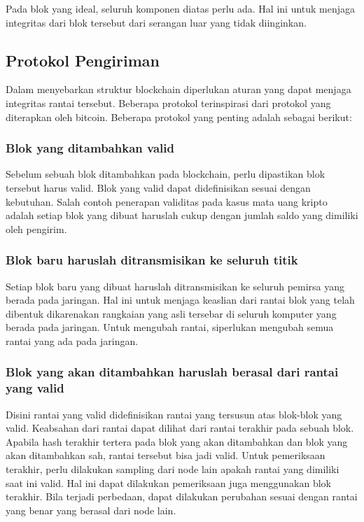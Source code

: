 \documentclass[10pt,conference]{IEEEtran}
\theoremstyle{definition}
\begin{document}
    
Pada blok yang ideal, seluruh komponen diatas perlu ada. Hal ini untuk menjaga integritas dari blok tersebut dari serangan luar yang tidak diinginkan.

\subsection{Protokol Pengiriman}
Dalam menyebarkan struktur blockchain diperlukan aturan yang dapat menjaga integritas rantai tersebut. Beberapa protokol terinspirasi dari protokol yang diterapkan oleh bitcoin. Beberapa protokol yang penting adalah sebagai berikut:

\subsubsection{Blok yang ditambahkan valid}
Sebelum sebuah blok ditambahkan pada blockchain, perlu dipastikan blok tersebut harus valid. Blok yang valid dapat didefinisikan sesuai dengan kebutuhan. Salah contoh penerapan validitas pada kasus mata uang kripto adalah setiap blok yang dibuat haruslah cukup dengan jumlah saldo yang dimiliki oleh pengirim.

\subsubsection{Blok baru haruslah ditransmisikan ke seluruh titik}
Setiap blok baru yang dibuat haruslah ditransmisikan ke seluruh pemirsa yang berada pada jaringan. Hal ini untuk menjaga keaslian dari rantai blok yang telah dibentuk dikarenakan rangkaian yang asli tersebar di seluruh komputer  yang berada pada jaringan. Untuk mengubah rantai, siperlukan mengubah semua rantai yang ada pada jaringan.

\subsubsection{Blok yang akan ditambahkan haruslah berasal dari rantai yang valid}
Disini rantai yang valid didefinisikan rantai yang tersusun atas blok-blok yang valid. Keabsahan dari rantai dapat dilihat dari rantai terakhir pada sebuah blok. Apabila hash terakhir tertera pada blok yang akan ditambahkan dan blok yang akan ditambahkan sah, rantai tersebut bisa jadi valid. Untuk pemeriksaan terakhir, perlu dilakukan sampling dari node lain apakah rantai yang dimiliki saat ini valid. Hal ini dapat dilakukan pemeriksaan juga menggunakan blok  terakhir. Bila terjadi perbedaan, dapat dilakukan perubahan sesuai dengan rantai yang benar yang berasal dari node lain.
\end{document}
